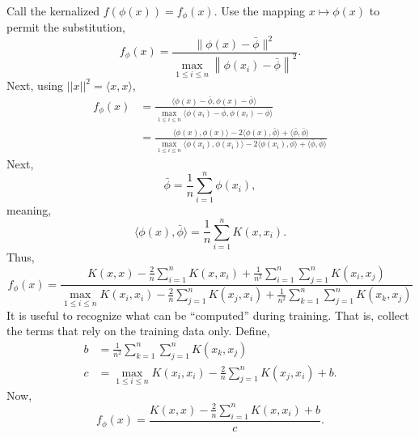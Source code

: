 \documentclass[12pt]{article}
\begin{document}
Call the kernalized $f(\phi(x)) = f_\phi(x)$. Use the mapping $x \mapsto \phi(x)$ to permit the substitution,
\begin{equation}
f_\phi(x)=\frac{\|\phi(x)-\bar{\phi}\|^{2}}{\max _{1 \leq i \leq n}\left\|\phi(x_{i})-\bar{\phi}\right\|^{2}}.
\end{equation}
Next, using $||x||^2 = \langle x, x \rangle$,
\begin{equation}
\begin{aligned}
f_\phi (x) &= \frac{\langle \phi(x) - \bar{\phi},   \phi(x) - \bar{\phi}\rangle}{ \max _{1 \leq i \leq n} \langle \phi(x_i) - \bar{\phi},   \phi(x_i) - \bar{\phi}\rangle} \\
&= \frac{\langle \phi(x), \phi(x) \rangle - 2 \langle \phi(x), \bar{\phi} \rangle + \langle \bar{\phi}, \bar{\phi} \rangle}{\max _{1 \leq i \leq n}  \langle \phi(x_i), \phi(x_i) \rangle - 2 \langle \phi(x_i), \bar{\phi} \rangle + \langle \bar{\phi}, \bar{\phi} \rangle}
\end{aligned}
\end{equation}
Next,
\begin{equation}
\bar{\phi} = \frac{1}{n} \sum_{i=1}^{n} \phi(x_i),
\end{equation}
meaning,
\begin{equation}
\langle \phi(x),  \bar{\phi} \rangle = \frac{1}{n} \sum_{i=1}^{n} K(x, x_i).
\end{equation}
Thus,
\begin{equation}
f_\phi(x) =\frac{K(x, x) -  \frac{2}{n} \sum_{i=1}^{n} K(x, x_i) + \frac{1}{n^2} \sum_{i=1}^{n} \sum_{j=1}^{n} K(x_i, x_j)}{\max _{1 \leq i \leq n} K(x_i, x_i) -  \frac{2}{n} \sum_{j=1}^{n} K(x_j, x_i) + \frac{1}{n^2} \sum_{k=1}^{n} \sum_{j=1}^{n} K(x_k, x_j)}
\end{equation}
It is useful to recognize what can be ``computed'' during training. That is, collect the terms that rely on the training data only. Define,
\begin{equation}
\begin{aligned}
b &=  \frac{1}{n^2} \sum_{k=1}^{n} \sum_{j=1}^{n} K(x_k, x_j) \\
c &= {\max _{1 \leq i \leq n} K(x_i, x_i) - \frac{2}{n} \sum_{j=1}^{n} K(x_j, x_i) + b}.
\end{aligned}
\end{equation}
Now,
\begin{equation}
f_\phi(x) =\frac{K(x, x) -  \frac{2}{n} \sum_{i=1}^{n} K(x, x_i) + b}{c}.
\end{equation}
\end{document}
